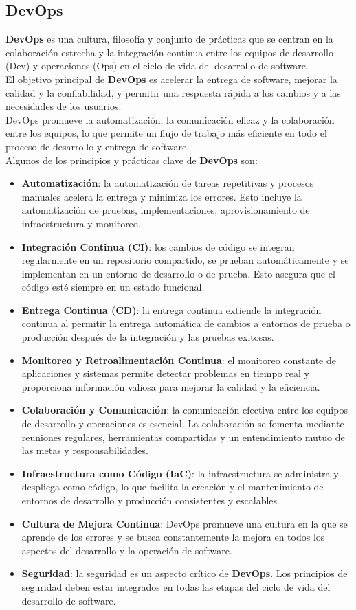 \subsection{DevOps~\cite{devops}}
\textbf{DevOps} es una cultura, filosofía y conjunto de prácticas que se centran en la colaboración 
estrecha y la integración continua entre los equipos de desarrollo (Dev) y operaciones (Ops) 
en el ciclo de vida del desarrollo de software. \\
El objetivo principal de \textbf{DevOps} es acelerar la entrega de software, 
mejorar la calidad y la confiabilidad, y permitir una respuesta rápida a los 
cambios y a las necesidades de los usuarios. \\DevOps promueve la automatización, 
la comunicación eficaz y la colaboración entre los equipos, lo que permite un flujo 
de trabajo más eficiente en todo el proceso de desarrollo y entrega de software.\\
Algunos de los principios y prácticas clave de \textbf{DevOps} son:
\begin{itemize}
   \item \textbf{Automatización}: la automatización de tareas repetitivas y procesos manuales acelera la entrega y minimiza los errores. Esto incluye la automatización de pruebas, implementaciones, aprovisionamiento de infraestructura y monitoreo.
   \item \textbf{Integración Continua (CI)}: los cambios de código se integran regularmente en un repositorio compartido, 
se prueban automáticamente y se implementan en un entorno de desarrollo o de prueba. 
Esto asegura que el código esté siempre en un estado funcional.
\item \textbf{Entrega Continua (CD)}: la entrega continua extiende la integración continua al permitir 
la entrega automática de cambios a entornos de prueba o producción después de la integración y 
las pruebas exitosas.
\item \textbf{Monitoreo y Retroalimentación Continua}: el monitoreo constante de aplicaciones y sistemas 
permite detectar problemas en tiempo real y proporciona información valiosa para 
mejorar la calidad y la eficiencia.
\item \textbf{Colaboración y Comunicación}: la comunicación efectiva entre los equipos de desarrollo y 
operaciones es esencial. La colaboración se fomenta mediante reuniones regulares, 
herramientas compartidas y un entendimiento mutuo de las metas y responsabilidades.
\item \textbf{Infraestructura como Código (IaC)}: la infraestructura se administra y despliega como código, 
lo que facilita la creación y el mantenimiento de entornos de desarrollo y producción 
consistentes y escalables.
\item \textbf{Cultura de Mejora Continua}: DevOps promueve una cultura en la que se aprende 
de los errores y se busca constantemente la mejora en todos los aspectos del desarrollo y 
la operación de software.
\item \textbf{Seguridad}: la seguridad es un aspecto crítico de \textbf{DevOps}. 
Los principios de seguridad deben estar integrados en todas las etapas 
del ciclo de vida del desarrollo de software.
\end{itemize}

